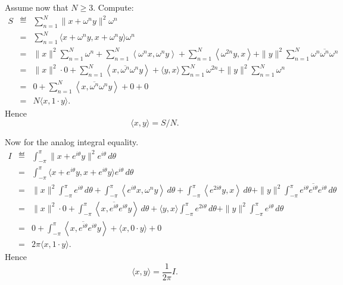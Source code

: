 \begin{enumerate}
Assume now that \(N\geq 3\). Compute:
\begin{eqnarray*}
S
&\eqdef&
 \sum_{n=1}^N \|x + \omega^n y\|^2 \omega^n \\
&=&
 \sum_{n=1}^N \langle x + \omega^n y, x + \omega^n y\rangle \omega^n  \\
&=&
    \|x\|^2 \sum_{n=1}^N \omega^n
 +  \sum_{n=1}^N \left\langle \omega^n x,  \omega^{n}y \right\rangle
 +  \sum_{n=1}^N \left\langle \omega^{2n} y, x \right\rangle
 + \|y\|^2 \sum_{n=1}^N  \omega^n \overline{\omega^n} \omega^n \\
&=&
    \|x\|^2 \cdot 0
    + \sum_{n=1}^N \left\langle x, \overline{\omega^n} \omega^{n}y \right\rangle
    + \langle y, x \rangle \sum_{n=1}^N \omega^{2n}
    + \|y\|^2 \sum_{n=1}^N \omega^n \\
&=&
    0 +
    \sum_{n=1}^N \left\langle x, \overline{\omega^n} \omega^{n}y \right\rangle
    + 0 + 0 \\
&=& N \langle x, 1\cdot y \rangle.
\end{eqnarray*}
Hence
\begin{equation*}
\langle x, y \rangle = S/N.
\end{equation*}

Now for the analog integral equality.
\begin{eqnarray*}
I
&\eqdef&
 \int_{-\pi}^\pi \|x + e^{i\theta} y\|^2 e^{i\theta}\,d\theta \\
&=&
 \int_{-\pi}^\pi
    \langle x + e^{i\theta} y, x + e^{i\theta} y \rangle e^{i\theta}\,d\theta \\
&=&
    \|x\|^2 \int_{-\pi}^\pi e^{i\theta}\,d\theta
 +  \int_{-\pi}^\pi
         \left\langle e^{i\theta} x,  \omega^{n} y \right\rangle\,d\theta
 +  \int_{-\pi}^\pi
         \left\langle e^{2i\theta} y, x \right\rangle\,d\theta
 + \|y\|^2 \int_{-\pi}^\pi
         e^{i\theta} \overline{e^{i\theta}} e^{i\theta}\,d\theta \\
&=&
     \|x\|^2 \cdot 0
   + \int_{-\pi}^\pi
      \left\langle x, \overline{e^{i\theta}} e^{i\theta}y
     \right\rangle \,d\theta
    + \langle y, x \rangle \int_{-\pi}^\pi e^{2i\theta}\,d\theta
    + \|y\|^2 \int_{-\pi}^\pi e^{i\theta}\,d\theta \\
&=&
    0 +
    \int_{-\pi}^\pi
      \left\langle x, \overline{e^{i\theta}} e^{i\theta}y \right\rangle
    + \langle x, 0\cdot y\rangle  + 0 \\
&=& 2\pi \langle x, 1\cdot y \rangle.
\end{eqnarray*}
Hence
\begin{equation*}
\langle x, y \rangle = \frac{1}{2\pi}I.
\end{equation*}

\end{enumerate}
